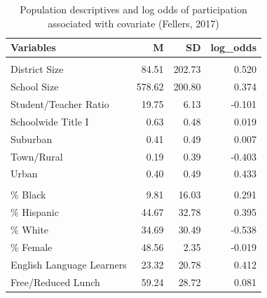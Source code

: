 \documentclass[english,man,floatsintext]{apa6}
\begin{document}
\begin{table}[H]

\caption{\label{tab:tab-RGM-Pars}Population descriptives and log odds of participation associated with covariate (Fellers, 2017)}
\centering
\begin{tabular}[t]{lrrr}
\toprule
Variables & M & SD & log\_odds\\
\midrule
\addlinespace[0.3em]
\multicolumn{4}{l}{\textbf{School Data}}\\
\hspace{1em}District Size & 84.51 & 202.73 & 0.520\\
\hspace{1em}School Size & 578.62 & 200.80 & 0.374\\
\hspace{1em}Student/Teacher Ratio & 19.75 & 6.13 & -0.101\\
\hspace{1em}Schoolwide Title I & 0.63 & 0.48 & 0.019\\
\hspace{1em}Suburban & 0.41 & 0.49 & 0.007\\
\hspace{1em}Town/Rural & 0.19 & 0.39 & -0.403\\
\hspace{1em}Urban & 0.40 & 0.49 & 0.433\\
\addlinespace[0.3em]
\multicolumn{4}{l}{\textbf{Student Data}}\\
\hspace{1em}\% Black & 9.81 & 16.03 & 0.291\\
\hspace{1em}\% Hispanic & 44.67 & 32.78 & 0.395\\
\hspace{1em}\% White & 34.69 & 30.49 & -0.538\\
\hspace{1em}\% Female & 48.56 & 2.35 & -0.019\\
\hspace{1em}English Language Learners & 23.32 & 20.78 & 0.412\\
\hspace{1em}Free/Reduced Lunch & 59.24 & 28.72 & 0.081\\
\bottomrule
\end{tabular}
\end{table}
\end{document}
